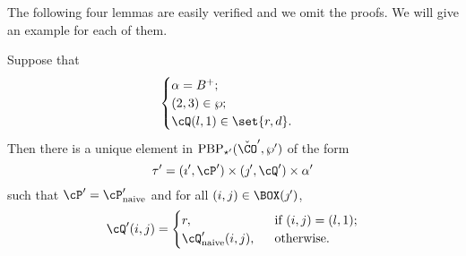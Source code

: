 \documentclass[ssunip]{subfiles}
\begin{document}
The following four lemmas are easily verified and we omit the proofs. We will give an example for each of them. 

\begin{lem}\label{descb}
  Suppose that 
  \[  \begin{cases}
 \alpha = B^+; & \\
 (2,3)\in \wp;\quad  &\\
 \cQ(l,1)\in \set{r,d}.
\end{cases}
\]
 Then there is a unique element in $\mathrm{PBP}_{\star'}(\check \CO',\wp')$ of the form
  \[
      \tau'=(\imath', \cP')\times (\jmath', \cQ')\times \alpha'
  \]
such that 
     $
     \cP' = \cP'_{\mathrm{naive}}
     $
     and 
     for all $(i,j)\in \BOX(\jmath')$, 
\[
\cQ'(i,j) = \begin{cases}
  r, & \ \text{ if  $(i,j) = (l,1)$;}\\
  \cQ'_{\mathrm{naive}}(i,j), & \ \text{ otherwise}.
\end{cases}
\]
\end{lem}
\end{document}
